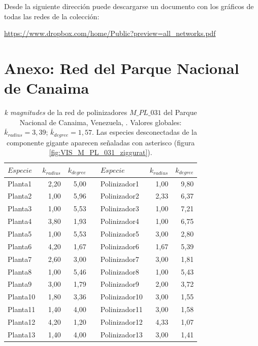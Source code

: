 Desde la siguiente dirección puede descargarse un documento con los gráficos de todas las redes de la colección:

\url{https://www.dropbox.com/home/Public?preview=all_networks.pdf}

\section{Anexo: Red del Parque Nacional de Canaima}
\label{ESTATICA_ANEXO_Canaima}
\begin{table}[htbp]
\fontsize{3mm}{3mm}\selectfont
  \centering
    \caption{\label{table:kmag_pl_031} \textit{k magnitudes} de la red  de polinizadores $M\_PL\_031$ del Parque Nacional de Canaima, Venezuela, \cite{ramirez1989biologia}. Valores globales: $\overline k_{radius} = 3,39$; $\overline k_{degree} = 1,57$. Las especies desconectadas de la componente gigante aparecen señaladas con asterisco (figura \ref{fig:VIS_M_PL_031_ziggurat}).}
    \begin{tabular}{lrrrlrr}
    \toprule
    $Especie$ & $k_{radius}$ & $k_{degree}$ &      & $Especie$ & $k_{radius}$ & $k_{degree}$ \\
    \midrule
    Planta1 & 2,20 & 5,00 &      & Polinizador1 & 1,00 & 9,80 \\
    Planta2 & 1,00 & 5,96 &      & Polinizador2 & 2,33 & 6,37 \\
    Planta3 & 1,00 & 5,53 &      & Polinizador3 & 1,00 & 7,21 \\
    Planta4 & 3,80 & 1,93 &      & Polinizador4 & 1,00 & 6,75 \\
    Planta5 & 1,00 & 5,53 &      & Polinizador5 & 3,00 & 2,80 \\
    Planta6 & 4,20 & 1,67 &      & Polinizador6 & 1,67 & 5,39 \\
    Planta7 & 2,60 & 3,00 &      & Polinizador7 & 3,00 & 1,81 \\
    Planta8 & 1,00 & 5,46 &      & Polinizador8 & 1,00 & 5,43 \\
    Planta9 & 3,00 & 1,79 &      & Polinizador9 & 2,00 & 3,72 \\
    Planta10 & 1,80 & 3,36 &      & Polinizador10 & 3,00 & 1,55 \\
    Planta11 & 1,40 & 4,00 &      & Polinizador11 & 3,00 & 1,58 \\
    Planta12 & 4,20 & 1,20 &      & Polinizador12 & 4,33 & 1,07 \\
    Planta13 & 1,40 & 4,00 &      & Polinizador13 & 3,00 & 1,41 \\

\end{tabular}
\end{table}
